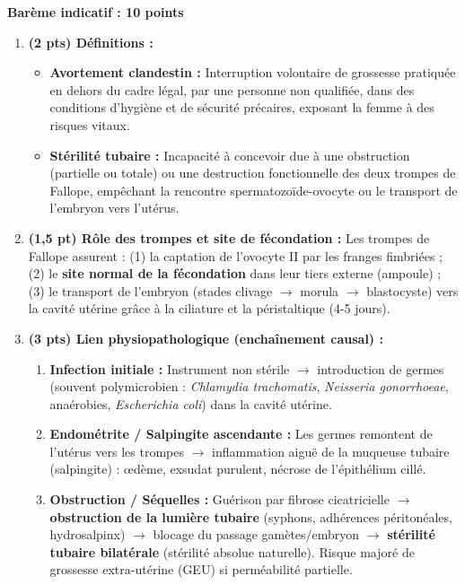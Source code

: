 \documentclass[11pt]{article}
\begin{document}
\begin{corrige}
\textbf{Barème indicatif : 10 points}
\begin{enumerate}[itemsep=6pt]
\item \textbf{(2 pts) Définitions :}
\begin{itemize}
\item \textbf{Avortement clandestin :} Interruption volontaire de grossesse pratiquée en dehors du cadre légal, par une personne non qualifiée, dans des conditions d'hygiène et de sécurité précaires, exposant la femme à des risques vitaux.
\item \textbf{Stérilité tubaire :} Incapacité à concevoir due à une obstruction (partielle ou totale) ou une destruction fonctionnelle des deux trompes de Fallope, empêchant la rencontre spermatozoïde-ovocyte ou le transport de l'embryon vers l'utérus.
\end{itemize}
\item \textbf{(1,5 pt) Rôle des trompes et site de fécondation :}
Les trompes de Fallope assurent : (1) la captation de l'ovocyte II par les franges fimbriées ; (2) le \textbf{site normal de la fécondation} dans leur tiers externe (ampoule) ; (3) le transport de l'embryon (stades clivage $\rightarrow$ morula $\rightarrow$ blastocyste) vers la cavité utérine grâce à la ciliature et la péristaltique (4-5 jours).
\item \textbf{(3 pts) Lien physiopathologique (enchaînement causal) :}
\begin{enumerate}
\item \textbf{Infection initiale :} Instrument non stérile $\rightarrow$ introduction de germes (souvent polymicrobien : \emph{Chlamydia trachomatis}, \emph{Neisseria gonorrhoeae}, anaérobies, \emph{Escherichia coli}) dans la cavité utérine.
\item \textbf{Endométrite / Salpingite ascendante :} Les germes remontent de l'utérus vers les trompes $\rightarrow$ inflammation aiguë de la muqueuse tubaire (salpingite) : œdème, exsudat purulent, nécrose de l'épithélium cillé.
\item \textbf{Obstruction / Séquelles :} Guérison par fibrose cicatricielle $\rightarrow$ \textbf{obstruction de la lumière tubaire} (syphons, adhérences péritonéales, hydrosalpinx) $\rightarrow$ blocage du passage gamètes/embryon $\rightarrow$ \textbf{stérilité tubaire bilatérale} (stérilité absolue naturelle). Risque majoré de grossesse extra-utérine (GEU) si perméabilité partielle.

\end{enumerate}
\end{enumerate}
\end{corrige}
\end{document}
